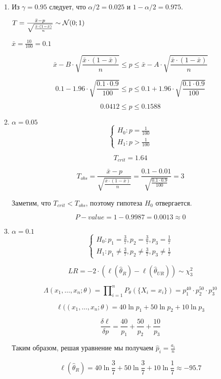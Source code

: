 \begin{enumerate} 
\item	
Из $\gamma = 0.95$ следует, что $\alpha / 2 = 0.025$ и $1 - \alpha / 2 = 0.975$.
	 
$T=\frac{\bar x - p}{\sqrt{\frac{\bar x \cdot (1 - \bar x) }{n}}}\sim \mathcal{N} (0;1)$
	
$\bar x = \frac{10}{100} = 0.1$

\[
\bar x - B \cdot \sqrt{\frac{\bar x \cdot (1 - \bar x) }{n}} \le p \le \bar x - A \cdot \sqrt{\frac{\bar x \cdot (1 - \bar x) }{n}}
\]

\[	
0.1 - 1.96 \cdot \sqrt{\frac{0.1 \cdot 0.9}{100}} \le p \le 0.1 + 1.96 \cdot \sqrt{\frac{0.1 \cdot 0.9}{100}}
\]

\[
0.0412 \le p \le 0.1588
\]
	
\item
$\alpha = 0.05$
\[
\begin{cases}
H_0: p = \frac{1}{100} \\
H_1: p > \frac{1}{100}
\end{cases}
\]
	
\[	
T_{crit} = 1.64
\]

\[
T_{obs} = \frac{\bar x - p}{\sqrt{\frac{\bar x \cdot (1 - \bar x) }{n}}} = \frac{0.1 - 0.01}{\sqrt{\frac{0.1 \cdot 0.9}{100}}} = 3 
\]

Заметим, что $T_{crit} < T_{obs}$, поэтому гипотеза $H_0$ отвергается.

\[
P-value = 1 - 0.9987 = 0.0013 \approx 0
\]
\item	
$\alpha = 0.1$	
\[
\begin{cases}
H_0: p_1 = \frac{3}{7}, p_2 = \frac{3}{7}, p_3 = \frac{1}{7} \\
H_1: p_1 \neq \frac{3}{7}, p_2 \neq \frac{3}{7}, p_3 \neq \frac{1}{7} 
\end{cases}
\]

\[	
LR = -2 \cdot (\ell(\hat \theta_R)-\ell(\hat \theta_{UR})) \sim \chi_3^2
\]

\[
\Lambda(x_1, \dots ,x_n;\theta) = \prod\nolimits_{i=1}^n P_\theta (\{X_i = x_i\})= p_1^{40} \cdot p_2^{50} \cdot p_3^{10}
\]

\[
\ell((x_1, \dots ,x_n;\theta)= 40\ln p_1 + 50\ln p_2 + 10\ln p_3
\]

\[
\frac{\delta \ell}{\delta p} = \frac{40}{p_1} + \frac{50}{p_2} + \frac{10}{p_3} 
\]

Таким образом, решая уравнение мы получаем $\hat p_i = \frac{a_i}{n}$

\[
\ell(\hat \theta_R) = 40\ln {\frac{3}{7}} + 50\ln {\frac{3}{7}} + 10\ln {\frac{1}{7}} \approx -95.7
\]


\end{enumerate}
